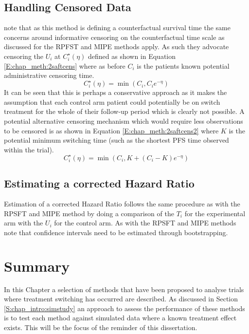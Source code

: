 \subsection{Handling Censored Data}
\label{S:chap_meth:2saftcens}
\cite{Latimer2016} note that as this method is defining a counterfactual survival time the same concerns around informative censoring on  the counterfactual time scale as discussed for the RPFST and MIPE methods apply. As such they advocate censoring the $U_i$ at $C_i^\star(\eta)$ defined as shown in Equation \ref{E:chap_meth:2saftcens} where as before $C_i$ is the patients known potential administrative censoring time.
\begin{equation}
\label{E:chap_meth:2saftcens}
C_i^\star(\eta) = \min \left( C_i, C_i e^{-\eta} \right)
\end{equation}
It can be seen that this is perhaps a conservative approach as it makes the assumption that each control arm patient could potentially be on switch treatment for the whole of their follow-up period which is clearly not possible. A potential alternative censoring mechanism which would require less observations to be censored is as shown in Equation \ref{E:chap_meth:2saftcens2} where $K$ is the potential minimum switching time (such as the shortest PFS time observed within the trial).
\begin{equation}
\label{E:chap_meth:2saftcens2}
C_i^\star(\eta) = \min \left( C_i, K + (C_i - K) e^{-\eta} \right)
\end{equation}

\subsection{Estimating a corrected Hazard Ratio}

Estimation of a corrected Hazard Ratio follows the same procedure as with the RPSFT and MIPE method by doing a comparison of the $T_i$ for the experimental arm with the $U_i$ for the control arm. As with the RPSFT and MIPE methods \cite{Latimer2016} note that confidence intervals need to be estimated through bootstrapping. 

\section{Summary}

In this Chapter a selection of methods that have been proposed to analyse trials where treatment switching has occurred are described. As discussed in Section \ref{S:chap_intro:simstudy} an approach to assess the performance of these methods is to test each method against simulated data where a known treatment effect exists. This will be the focus of the reminder of this dissertation. 



